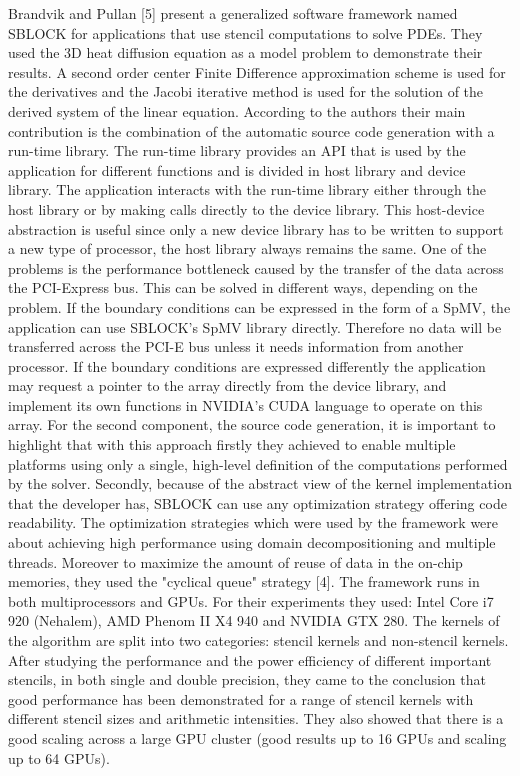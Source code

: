 Brandvik and Pullan [5] present a generalized software framework named SBLOCK for applications that use stencil computations to solve PDEs. They used the 3D heat diffusion equation as a model problem to demonstrate their results. A second order center Finite Difference approximation scheme is used for the derivatives and the Jacobi iterative method is used for the solution of the derived system of the linear equation.  According to the authors their main contribution is the combination of the automatic source code generation with a run-time library. The run-time library provides an API that is used by the application for different functions and is divided in host library and device library. The application interacts with the run-time library either through the host library or by making calls directly to the device library. This host-device abstraction is useful since only a new device library has to be written to support a new type of processor, the host library always remains the same. One of the problems is the performance bottleneck caused by the transfer of the data across the PCI-Express bus. This can be solved in different ways, depending on the problem. If the boundary conditions can be expressed in the form of a SpMV, the application can use SBLOCK’s SpMV library directly. Therefore no data will be transferred across the PCI-E bus unless it needs information from another processor. If the boundary conditions are expressed differently the application may request a pointer to the array directly from the device library, and implement its own functions in NVIDIA’s CUDA language to operate on this array. For the second component, the source code generation, it is important to highlight that with this approach firstly they achieved to enable multiple platforms using only a single, high-level definition of the computations performed by the solver. Secondly, because of the abstract view of the kernel implementation that the developer has, SBLOCK can use any optimization strategy offering code readability. The optimization strategies which were used by the framework were about achieving high performance using domain decompositioning and multiple threads. Moreover to maximize the amount of reuse of data in the on-chip memories, they used the "cyclical queue" strategy [4]. The framework runs in both multiprocessors and GPUs. For their experiments they used: Intel Core i7 920 (Nehalem), AMD Phenom II X4 940 and NVIDIA GTX 280. The kernels of the algorithm are split into two categories: stencil kernels and non-stencil kernels. After studying the performance and the power efficiency of different important stencils, in both single and double precision, they came to the conclusion that good performance has been demonstrated for a range of stencil kernels with different stencil sizes and arithmetic intensities. They also showed that there is a good scaling across a large GPU cluster (good results up to 16 GPUs and scaling up to 64 GPUs).

